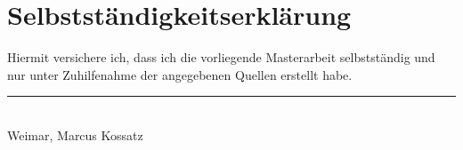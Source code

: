 \section*{Selbstständigkeitserklärung}

\vspace{10px}

Hiermit versichere ich, dass ich die vorliegende Masterarbeit selbstständig und nur unter Zuhilfenahme der angegebenen Quellen erstellt habe.

\vspace{20px}

\hfill \rule{120px}{0.5px} \\
Weimar, \submissionDate \hfill Marcus Kossatz

\newpage